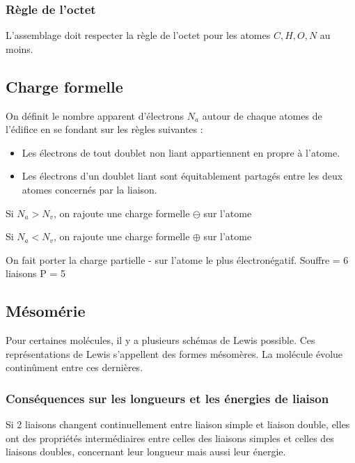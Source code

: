 \documentclass[french]{yLectureNote}
\begin{document}
\subsubsection{Règle de l'octet}
L'assemblage doit respecter la règle de l'octet pour les atomes $C,H,O,N$ au moins.


\subsection{Charge formelle}
On définit le nombre apparent d’électrons $N_a$ autour de chaque atomes de l’édifice en se fondant sur les règles suivantes :
\begin{itemize}
 \item Les électrons de tout doublet non liant appartiennent en propre
à l’atome.
\item Les électrons d’un doublet liant sont équitablement partagés
entre les deux atomes concernés par la liaison.
\end{itemize}
Si $N_a > N_v$, on rajoute une charge formelle $\ominus$ sur l'atome

Si $N_a < N_v$, on rajoute une charge formelle $\oplus$ sur l'atome

On fait porter la charge partielle - sur l'atome le plus électronégatif.
Souffre  = 6 liaisons
P = 5
\subsection{Mésomérie}
Pour certaines molécules, il y a plusieurs schémas de Lewis possible. Ces représentations de Lewis s'appellent des formes mésomères. La molécule évolue contin\^ument entre ces dernières.

\subsubsection{Conséquences sur les longueurs et les énergies de liaison}
Si 2 liaisons changent continuellement entre liaison simple et liaison double, elles ont des propriétés intermédiaires entre celles des liaisons simples et celles des liaisons doubles, concernant leur longueur mais aussi leur énergie.
\end{document}
